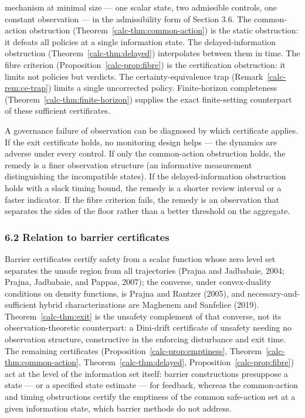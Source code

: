 \documentclass[10pt,twocolumn]{article}
\theoremstyle{definition}
\begin{document}
mechanism at minimal size --- one scalar state, two admissible controls,
one constant observation --- in the admissibility form of Section 3.6. The common-action obstruction (Theorem~\ref{calc-thm:common-action}) is the static
obstruction: it defeats all policies at a single information state. The
delayed-information obstruction (Theorem~\ref{calc-thm:delayed}) interpolates between them in
time. The fibre criterion (Proposition~\ref{calc-prop:fibre}) is the certification obstruction:
it limits not policies but verdicts. The certainty-equivalence trap
(Remark~\ref{calc-rem:ce-trap}) limits a single uncorrected policy. Finite-horizon completeness
(Theorem~\ref{calc-thm:finite-horizon}) supplies the exact finite-setting
counterpart of these sufficient certificates.

A governance failure of observation can be diagnosed by which
certificate applies. If the exit certificate holds, no monitoring design
helps --- the dynamics are adverse under every control. If only the
common-action obstruction holds, the remedy is a finer observation
structure (an informative measurement distinguishing the incompatible
states). If the delayed-information obstruction holds with a slack
timing bound, the remedy is a shorter review interval or a faster
indicator. If the fibre criterion fails, the remedy is an observation
that separates the sides of the floor rather than a better threshold on
the aggregate.

\subsubsection{6.2 Relation to barrier
certificates}\label{calc-relation-to-barrier-certificates}

Barrier certificates certify safety from a scalar function whose zero level set separates the unsafe region from all trajectories (Prajna and Jadbabaie, 2004; Prajna, Jadbabaie, and Pappas, 2007); the converse, under convex-duality conditions on density functions, is Prajna and Rantzer (2005), and necessary-and-sufficient hybrid characterizations are Maghenem and Sanfelice (2019). Theorem~\ref{calc-thm:exit} is the unsafety complement of that converse, not its observation-theoretic counterpart: a Dini-drift certificate of unsafety needing no observation structure, constructive in the enforcing disturbance and exit time. The remaining certificates (Proposition~\ref{calc-prop:emptiness}, Theorem~\ref{calc-thm:common-action}, Theorem~\ref{calc-thm:delayed}, Proposition~\ref{calc-prop:fibre}) act at the level of the information set itself: barrier constructions presuppose a state --- or a specified state estimate --- for feedback, whereas the common-action and timing obstructions certify the emptiness of the common safe-action set at a given information state, which barrier methods do not address.
\end{document}
